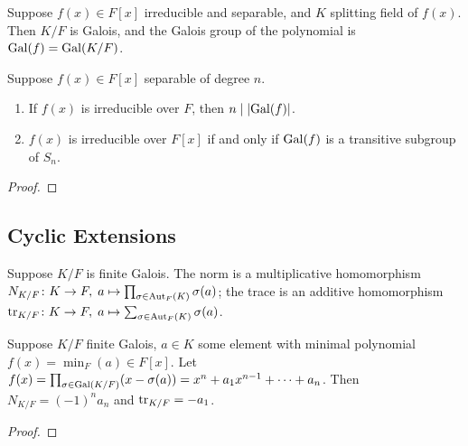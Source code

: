 
\begin{definition}
    Suppose \(f(x) \in F[x]\) irreducible and separable,
    and \(K\) splitting field of \(f(x)\).
    Then \(K/F\) is Galois,
    and the Galois group of the polynomial is \(\operatorname{Gal}(f) = \operatorname{Gal}(K/F)\).
\end{definition}
\begin{theorem}
    Suppose \(f(x) \in F[x]\) separable of degree \(n\).
    \begin{enumerate}[label={(\alph*)}, itemsep=0mm]
        \item If \(f(x)\) is irreducible over \(F\),
            then \(n \mid \abs{\operatorname{Gal}(f)}\).
        \item \(f(x)\) is irreducible over \(F[x]\)
            if and only if \(\operatorname{Gal}(f)\) is a transitive subgroup of \(S_n\).
    \end{enumerate}
\end{theorem}
\begin{proof}
\end{proof}


\subsection{Cyclic Extensions}

\begin{definition}
    Suppose \(K/F\) is finite Galois.
    The norm is a multiplicative homomorphism
    \(N_{K/F}\colon K\to F,\;a\mapsto\prod_{\sigma\in\operatorname{Aut}_F(K)} \sigma(a)\);
    the trace is an additive homomorphism
    \(\tr_{K/F}\colon K\to F,\;a\mapsto\sum_{\sigma\in\operatorname{Aut}_F(K)} \sigma(a)\).
\end{definition}
\begin{proposition}
    Suppose \(K/F\) finite Galois,
    \(a \in K\) some element with minimal polynomial \(f(x) = \min_F(a) \in F[x]\).
    Let \(f(x) = \prod_{\sigma\in\operatorname{Gal}(K/F)} (x-\sigma(a)) = x^n + a_1 x^{n-1} + \cdots + a_n\).
    Then \(N_{K/F} = {(-1)}^n a_n\)  and \(\tr_{K/F} = -a_1\).
\end{proposition}
\begin{proof}
\end{proof}

